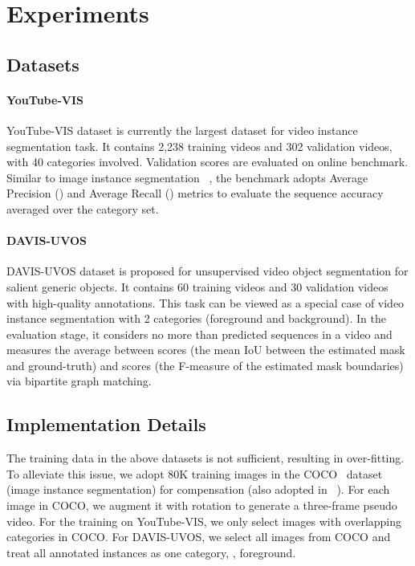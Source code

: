 \documentclass[10pt,twocolumn,letterpaper]{article}
\begin{document}
	\section{Experiments}
	\subsection{Datasets} \label{Sec:dataset}
	\paragraph{YouTube-VIS~\cite{yang2019vis}} YouTube-VIS dataset is currently the largest dataset for video instance segmentation task. It contains 2,238 training videos and 302 validation videos, with 40 categories involved. Validation scores are evaluated on online benchmark. Similar to image instance segmentation~\cite{lin2014coco} , the benchmark adopts Average Precision () and Average Recall () metrics to evaluate the sequence accuracy averaged over the category set. 
	
	\vspace{-0.2in}
	\paragraph{DAVIS-UVOS~\cite{Caelles_arXiv_2019}} DAVIS-UVOS dataset is proposed for unsupervised video object segmentation for salient generic objects. It contains 60 training videos and 30 validation videos with high-quality annotations.
	This task can be viewed as a special case of video instance segmentation with 2 categories (foreground and background). 
	In the evaluation stage, it considers no more than  predicted sequences in a video and measures the average between  scores (the mean IoU between the estimated mask and ground-truth) and  scores (the F-measure of the estimated mask boundaries) via bipartite graph matching.	
	
	\subsection{Implementation Details}\label{Sec:Imp}
	The training data in the above datasets is not sufficient, resulting in over-fitting. To alleviate this issue, we adopt 80K training images in the COCO~\cite{lin2014coco} dataset (image instance segmentation) for compensation (also adopted in ~\cite{athar2020stem}).
	For each image in COCO, we augment it with  rotation to generate a three-frame pseudo video. For the training on YouTube-VIS, we only select images with overlapping categories in COCO. For DAVIS-UVOS, we select all images from COCO and treat all annotated instances as one category, \ie, foreground. 
	
\end{document}
